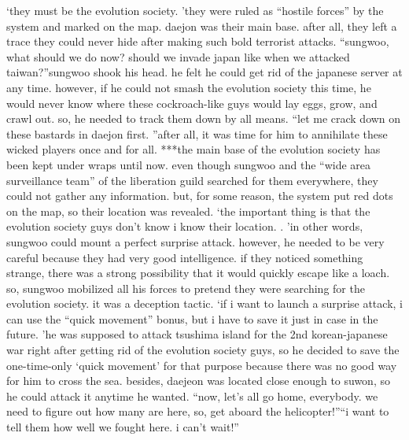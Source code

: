‘they must be the evolution society.
’they were ruled as “hostile forces” by the system and marked on the map.
 daejon was their main base.
 after all, they left a trace they could never hide after making such bold terrorist attacks.
“sungwoo, what should we do now? should we invade japan like when we attacked taiwan?”sungwoo shook his head.
 he felt he could get rid of the japanese server at any time.
however, if he could not smash the evolution society this time, he would never know where these cockroach-like guys would lay eggs, grow, and crawl out.
 so, he needed to track them down by all means.
“let me crack down on these bastards in daejon first.
”after all, it was time for him to annihilate these wicked players once and for all.
***the main base of the evolution society has been kept under wraps until now.
 even though sungwoo and the “wide area surveillance team” of the liberation guild searched for them everywhere, they could not gather any information.
but, for some reason, the system put red dots on the map, so their location was revealed.
‘the important thing is that the evolution society guys don’t know i know their location.
.
’in other words, sungwoo could mount a perfect surprise attack.
 however, he needed to be very careful because they had very good intelligence.
 if they noticed something strange, there was a strong possibility that it would quickly escape like a loach.
so, sungwoo mobilized all his forces to pretend they were searching for the evolution society.
it was a deception tactic.
‘if i want to launch a surprise attack, i can use the “quick movement” bonus, but i have to save it just in case in the future.
’he was supposed to attack tsushima island for the 2nd korean-japanese war right after getting rid of the evolution society guys, so he decided to save the one-time-only ‘quick movement’ for that purpose because there was no good way for him to cross the sea.
besides, daejeon was located close enough to suwon, so he could attack it anytime he wanted.
“now, let’s all go home, everybody.
 we need to figure out how many are here, so, get aboard the helicopter!”“i want to tell them how well we fought here.
 i can’t wait!”

